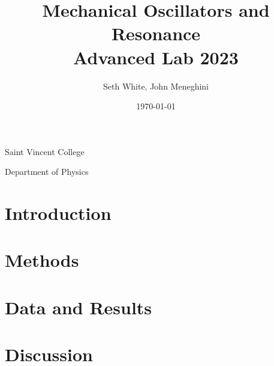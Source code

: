 \documentclass[12pt, letterpaper]{article}
\title{Mechanical Oscillators and Resonance \\
    \large Advanced Lab 2023}
\author{Seth White, John Meneghini}
\date{\today}
\begin{document}
    \maketitle

\centerline{\large Saint Vincent College}
\centerline{Department of Physics}

    \begin{abstract}
        
    \end{abstract}
\newpage

    \section*{Introduction}
    




    \section*{Methods}
    

	\newpage
    \section*{Data and Results}
    

	\newpage
    \section*{Discussion}
    

    \newpage
%    
\end{document}
